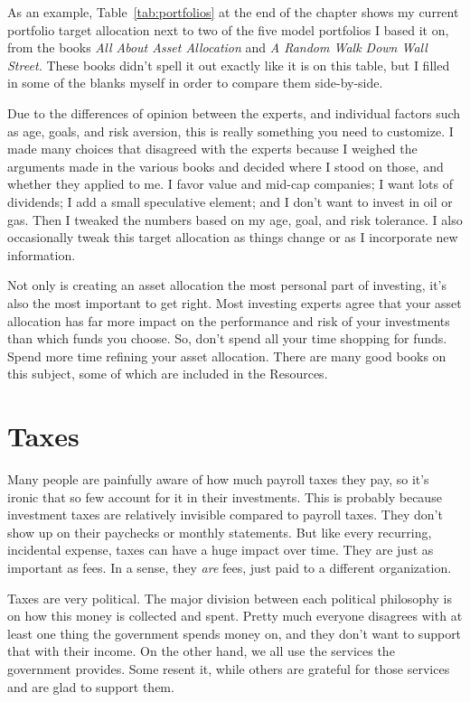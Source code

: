 As an example, Table~\ref{tab:portfolios} at the end of the chapter shows my current portfolio target allocation next to two of the five model portfolios I based it on, from the books \emph{All About Asset Allocation} and \emph{A Random Walk Down Wall Street.} These books didn't spell it out exactly like it is on this table, but I filled in some of the blanks myself in order to compare them side-by-side.

Due to the differences of opinion between the experts, and individual factors such as age, goals, and risk aversion, this is really something you need to customize. I made many choices that disagreed with the experts because I weighed the arguments made in the various books and decided where I stood on those, and whether they applied to me. I favor value and mid-cap companies; I want lots of dividends; I add a small speculative element; and I don't want to invest in oil or gas. Then I tweaked the numbers based on my age, goal, and risk tolerance. I also occasionally tweak this target allocation as things change or as I incorporate new information.

Not only is creating an asset allocation the most personal part of investing, it's also the most important to get right. Most investing experts agree that your asset allocation has far more impact on the performance and risk of your investments than which funds you choose. So, don't spend all your time shopping for funds. Spend more time refining your asset allocation. There are many good books on this subject, some of which are included in the Resources.

\section{Taxes}
Many people are painfully aware of how much payroll taxes they pay, so it's ironic that so few account for it in their investments. This is probably because investment taxes are relatively invisible compared to payroll taxes. They don't show up on their paychecks or monthly statements. But like every recurring, incidental expense, taxes can have a huge impact over time. They are just as important as fees. In a sense, they \emph{are} fees, just paid to a different organization.

Taxes are very political. The major division between each political philosophy is on how this money is collected and spent. Pretty much everyone disagrees with at least one thing the government spends money on, and they don't want to support that with their income. On the other hand, we all use the services the government provides. Some resent it, while others are grateful for those services and are glad to support them.

